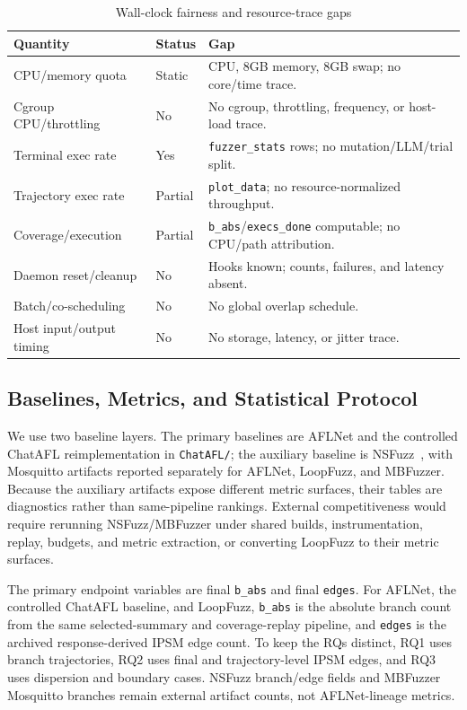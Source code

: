 \documentclass[final,5p,times,number]{elsarticle}
\begin{document}
\begin{table}[!t]
\centering
\caption{Wall-clock fairness and resource-trace gaps}
\label{tab:wallclock_resource_status}
{\scriptsize
\setlength{\tabcolsep}{3.6pt}
\renewcommand{\arraystretch}{1.05}
\begin{tabularx}{0.88\textwidth}{>{\raggedright\arraybackslash}p{}
>{\centering\arraybackslash}p{}
>{\raggedright\arraybackslash}X}
\toprule
Quantity & Status & Gap \\
\midrule
CPU/memory quota & Static & 1 CPU, 8GB memory, 8GB swap; no core/time trace. \\
Cgroup CPU/throttling & No & No cgroup, throttling, frequency, or host-load trace. \\
Terminal exec rate & Yes & \texttt{fuzzer\_stats} rows; no mutation/LLM/trial split. \\
Trajectory exec rate & Partial & \texttt{plot\_data}; no resource-normalized throughput. \\
Coverage/execution & Partial & \texttt{b\_abs}/\texttt{execs\_done} computable; no CPU/path attribution. \\
Daemon reset/cleanup & No & Hooks known; counts, failures, and latency absent. \\
Batch/co-scheduling & No & No global overlap schedule. \\
Host input/output timing & No & No storage, latency, or jitter trace. \\
\bottomrule
\end{tabularx}
}
\end{table}

\subsection{Baselines, Metrics, and Statistical Protocol}
We use two baseline layers. The primary baselines are AFLNet and the controlled ChatAFL reimplementation in \texttt{ChatAFL/}; the auxiliary baseline is NSFuzz~\cite{nsfuzz}, with Mosquitto artifacts reported separately for AFLNet, LoopFuzz, and MBFuzzer. Because the auxiliary artifacts expose different metric surfaces, their tables are diagnostics rather than same-pipeline rankings. External competitiveness would require rerunning NSFuzz/MBFuzzer under shared builds, instrumentation, replay, budgets, and metric extraction, or converting LoopFuzz to their metric surfaces.

The primary endpoint variables are final \texttt{b\_abs} and final \texttt{edges}. For AFLNet, the controlled ChatAFL baseline, and LoopFuzz, \texttt{b\_abs} is the absolute branch count from the same selected-summary and coverage-replay pipeline, and \texttt{edges} is the archived response-derived IPSM edge count. To keep the RQs distinct, RQ1 uses branch trajectories, RQ2 uses final and trajectory-level IPSM edges, and RQ3 uses dispersion and boundary cases. NSFuzz branch/edge fields and MBFuzzer Mosquitto branches remain external artifact counts, not AFLNet-lineage metrics.
\end{document}
